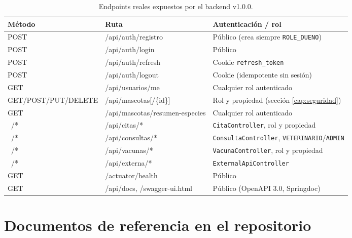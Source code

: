 \begin{table}[H]
  \centering
  \small
  \caption{Endpoints reales expuestos por el backend v1.0.0.}
  \label{tab:endpoints-final}
  \begin{tabular}{@{}p{3.0cm}p{4.2cm}p{7.0cm}@{}}
    \toprule
    M\'etodo & Ruta & Autenticaci\'on / rol \\
    \midrule
    POST & /api/auth/registro & P\'ublico (crea siempre \texttt{ROLE\_DUENO}) \\
    POST & /api/auth/login & P\'ublico \\
    POST & /api/auth/refresh & Cookie \texttt{refresh\_token} \\
    POST & /api/auth/logout & Cookie (idempotente sin sesi\'on) \\
    GET & /api/usuarios/me & Cualquier rol autenticado \\
    GET\allowbreak/POST\allowbreak/PUT\allowbreak/DELETE & /api\allowbreak/mascotas[\allowbreak/\{id\}] & Rol y propiedad (secci\'on \ref{cap:seguridad}) \\
    GET & /api/mascotas/resumen-especies & Cualquier rol autenticado \\
    \ /* & /api/citas/* & \texttt{CitaController}, rol y propiedad \\
    \ /* & /api/consultas/* & \texttt{ConsultaController}, \texttt{VETERINARIO}/\texttt{ADMIN} \\
    \ /* & /api/vacunas/* & \texttt{VacunaController}, rol y propiedad \\
    \ /* & /api/externa/* & \texttt{ExternalApiController} \\
    GET & /actuator/health & P\'ublico \\
    GET & /api/docs, /swagger-ui.html & P\'ublico (OpenAPI 3.0, Springdoc) \\
    \bottomrule
  \end{tabular}
\end{table}

\section{Documentos de referencia en el repositorio}

